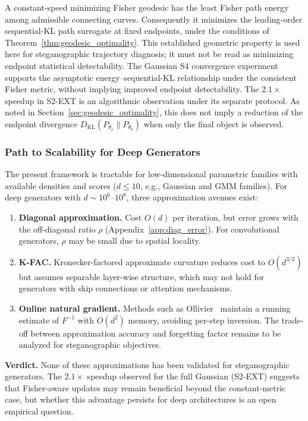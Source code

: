 \documentclass[a4paper,fleqn]{cas-dc}
\newcommand{\DKL}{D_{\mathrm{KL}}}
\begin{document}
A constant-speed minimizing Fisher geodesic has the least Fisher
path energy among admissible connecting curves. Consequently it
minimizes the leading-order sequential-KL path surrogate at fixed
endpoints, under the conditions of Theorem~\ref{thm:geodesic_optimality}.
This established geometric property is used here for steganographic
trajectory diagnosis; it must not be read as minimizing endpoint
statistical detectability. The Gaussian S4 convergence experiment supports the asymptotic energy--sequential-KL relationship under the consistent Fisher metric, without implying improved endpoint detectability. The $2.1\times$ speedup in S2-EXT is an algorithmic observation under its separate protocol.  As noted in Section~\ref{sec:geodesic_optimality},
this does not imply a reduction of the endpoint divergence
$\DKL(P_{\theta_1}\|P_{\theta_0})$ when only the final object is observed.

\subsubsection{Path to Scalability for Deep Generators}

The present framework is tractable for low-dimensional parametric families
with available densities and scores ($d \leq 10$, e.g., Gaussian and GMM
families).  For deep generators
with $d \sim 10^6$--$10^8$, three approximation avenues exist:

\begin{enumerate}
  \item \textbf{Diagonal approximation.}  Cost $O(d)$ per iteration,
        but error grows with the off-diagonal ratio $\rho$
        (Appendix~\ref{app:diag_error}).  For convolutional generators,
        $\rho$ may be small due to spatial locality.
  \item \textbf{K-FAC.}  Kronecker-factored approximate curvature
        reduces cost to $O(d^{3/2})$ but assumes separable layer-wise
        structure, which may not hold for generators with skip
        connections or attention mechanisms.
  \item \textbf{Online natural gradient.}  Methods such as
        Ollivier~\cite{ollivier2015riemannian} maintain a running estimate of $F^{-1}$ with
        $O(d^2)$ memory, avoiding per-step inversion.  The trade-off
        between approximation accuracy and forgetting factor remains
        to be analyzed for steganographic objectives.
\end{enumerate}

\textbf{Verdict.}  None of these approximations has been validated for
steganographic generators. The $2.1\times$ speedup observed for the full Gaussian (S2-EXT) suggests that Fisher-aware updates may remain beneficial beyond the constant-metric
case, but whether this advantage persists for deep architectures is an
open empirical question.
\end{document}
